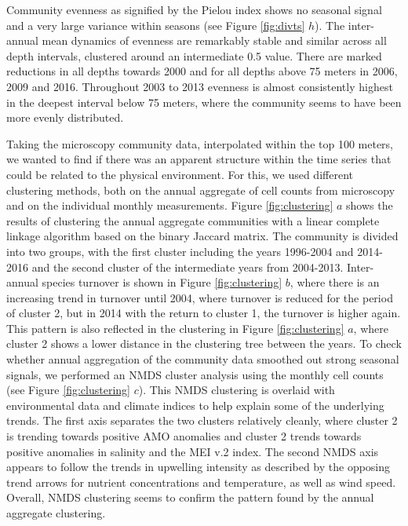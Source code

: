 \documentclass[draft]{agujournal2019}
\begin{document}
Community evenness as signified by the Pielou index shows no seasonal signal and a very large variance within seasons (see Figure \ref{fig:divts} $h$). The inter-annual mean dynamics of evenness are remarkably stable and similar across all depth intervals, clustered around an intermediate 0.5 value. There are marked reductions in all depths towards 2000 and for all depths above 75 meters in 2006, 2009 and 2016. Throughout 2003 to 2013 evenness is almost consistently highest in the deepest interval below 75 meters, where the community seems to have been more evenly distributed. 


Taking the microscopy community data, interpolated within the top 100 meters, we wanted to find if there was an apparent structure within the time series that could be related to the physical environment. For this, we used different clustering methods, both on the annual aggregate of cell counts from microscopy and on the individual monthly measurements. Figure \ref{fig:clustering} $a$ shows the results of clustering the annual aggregate communities with a linear complete linkage algorithm based on the binary Jaccard matrix. The community is divided into two groups, with the first cluster including the years 1996-2004 and 2014-2016 and the second cluster of the intermediate years from 2004-2013. 
Inter-annual species turnover is shown in Figure \ref{fig:clustering} $b$, where there is an increasing trend in turnover until 2004, where turnover is reduced for the period of cluster 2, but in 2014 with the return to cluster 1, the turnover is higher again. This pattern is also reflected in the clustering in Figure \ref{fig:clustering} $a$, where cluster 2 shows a lower distance in the clustering tree between the years. 
To check whether annual aggregation of the community data smoothed out strong seasonal signals, we performed an NMDS cluster analysis using the monthly cell counts (see Figure \ref{fig:clustering} $c$). This NMDS clustering is overlaid with environmental data and climate indices to help explain some of the underlying trends. The first axis separates the two clusters relatively cleanly, where cluster 2 is trending towards positive AMO anomalies and cluster 2 trends towards positive anomalies in salinity and the MEI v.2 index. The second NMDS axis appears to follow the trends in upwelling intensity as described by the opposing trend arrows for nutrient concentrations and temperature, as well as wind speed. Overall, NMDS clustering seems to confirm the pattern found by the annual aggregate clustering. 
\end{document}
